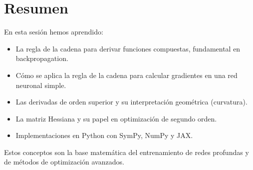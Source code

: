 \documentclass[12pt,a4paper,openany,oneside]{book}
\begin{document}
\section{Resumen}
En esta sesión hemos aprendido:
\begin{itemize}
    \item La regla de la cadena para derivar funciones compuestas, fundamental en backpropagation.
    \item Cómo se aplica la regla de la cadena para calcular gradientes en una red neuronal simple.
    \item Las derivadas de orden superior y su interpretación geométrica (curvatura).
    \item La matriz Hessiana y su papel en optimización de segundo orden.
    \item Implementaciones en Python con SymPy, NumPy y JAX.
\end{itemize}
Estos conceptos son la base matemática del entrenamiento de redes profundas y de métodos de optimización avanzados.
\end{document}
